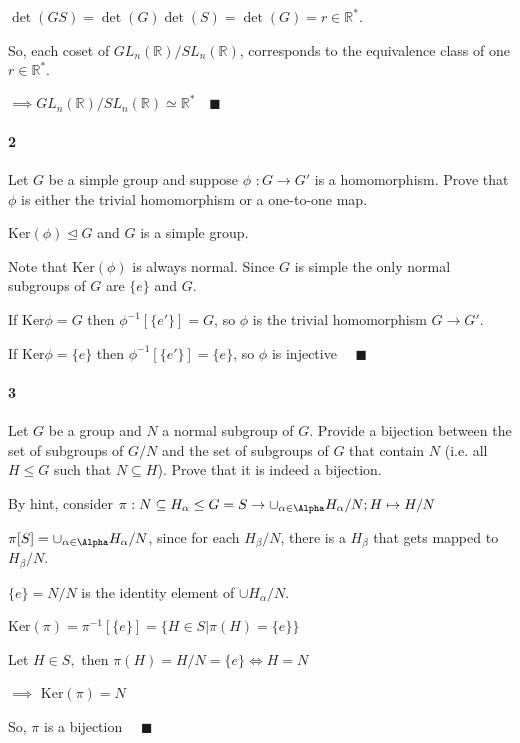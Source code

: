 \documentclass{article}
\newcommand\R{\mathbb{R}}
\begin{document}
$\det(GS) = \det(G)\det(S) = \det(G) = r\in \R^*$.

So, each coset of $GL_n(\R)/SL_n(\R)$, corresponds to the equivalence
class of one $r\in\R^*$.

$\implies $$GL_n(\R)/SL_n(\R)\simeq \R^* \quad \blacksquare$

\paragraph{2} Let $G$ be a simple group and suppose $\phi$ $: G → G'$
is a homomorphism. Prove that $\phi$ is
either the trivial homomorphism or a one-to-one map.


Ker$(\phi) \trianglelefteq G$ and $G$ is a simple group.

Note that Ker$(\phi)$ is always normal. Since $G$ is simple the only normal subgroups of
$G$ are $\{e\}$ and $G$.

If Ker$\phi = G$ then $\phi^{-1}[\{e'\}] = G$, so $\phi$ is the
trivial homomorphism $G\rightarrow G'$.

If Ker$\phi = \{e\}$ then $\phi^{-1}[\{e'\}] = \{e\}$, so $\phi$ is
injective $\quad \blacksquare$

\paragraph{3} Let $G$ be a group and $N$ a normal subgroup of $G$. Provide a bijection between the set of
subgroups of $G/N$ and the set of subgroups of $G$ that contain $N$ (i.e. all $H ≤ G$ such that
$N ⊆ H$). Prove that it is indeed a bijection.


By hint, consider  $\pi: N \subseteq H_\alpha\leq G = S\rightarrow
\cup_{\alpha \in \Alpha} H_\alpha/N; H\mapsto H/N$

$\pi[S] = \cup_{\alpha \in \Alpha} H_\alpha/N$, since for each $H_\beta/N$, there is a $H_\beta$ that gets mapped
to $H_\beta/N$.

$\{e\}= N/N$ is the identity element of $\cup H_\alpha/N$.

Ker$(\pi)=\pi^{-1}[\{e\}] = \{H\in S| \pi(H) =\{e\}\}$

Let $H\in S,$ then $\pi(H) = H/N = \{e\}  \iff H = N$

$\implies$ Ker$(\pi) = N$

So, $\pi$ is a bijection $\quad \blacksquare$
\end{document}
